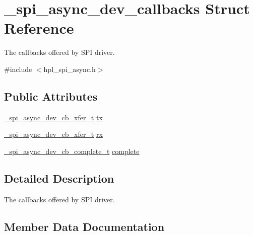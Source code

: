 \hypertarget{struct__spi__async__dev__callbacks}{}\section{\+\_\+spi\+\_\+async\+\_\+dev\+\_\+callbacks Struct Reference}
\label{struct__spi__async__dev__callbacks}


The callbacks offered by S\+PI driver.  




{\ttfamily \#include $<$hpl\+\_\+spi\+\_\+async.\+h$>$}

\subsection*{Public Attributes}
\begin{DoxyCompactItemize}
\item 
\hyperlink{group__hpl__spi_ga62275ef9b2c245ed2ed183f9d1c98a31}{\+\_\+spi\+\_\+async\+\_\+dev\+\_\+cb\+\_\+xfer\+\_\+t} \hyperlink{struct__spi__async__dev__callbacks_a11f5eabd90c9c4be55cc0c29bc30cbad}{tx}
\item 
\hyperlink{group__hpl__spi_ga62275ef9b2c245ed2ed183f9d1c98a31}{\+\_\+spi\+\_\+async\+\_\+dev\+\_\+cb\+\_\+xfer\+\_\+t} \hyperlink{struct__spi__async__dev__callbacks_ad8adad74d94a9483eef159503a900dae}{rx}
\item 
\hyperlink{group__hpl__spi_ga446094494e8aacbf4ad1a74c868d9809}{\+\_\+spi\+\_\+async\+\_\+dev\+\_\+cb\+\_\+complete\+\_\+t} \hyperlink{struct__spi__async__dev__callbacks_ae523b864693e658c31eecf5384a31916}{complete}
\end{DoxyCompactItemize}


\subsection{Detailed Description}
The callbacks offered by S\+PI driver. 

\subsection{Member Data Documentation}
\mbox{\label{struct__spi__async__dev__callbacks_ae523b864693e658c31eecf5384a31916}} 
